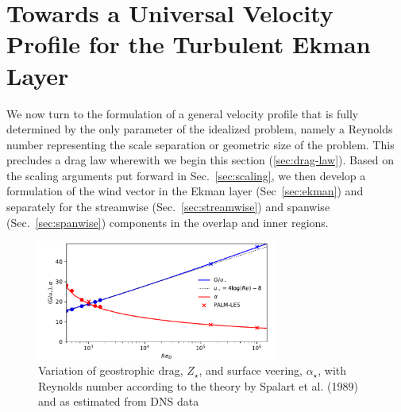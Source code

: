 \documentclass[a4paper,11pt]{amsart}
\begin{document}
\section{Towards a Universal Velocity Profile for the Turbulent Ekman Layer}
\label{sec:profiles} 
%
We now turn to the formulation of a general velocity profile that is fully determined by the only
parameter of the idealized problem, namely a Reynolds number representing the scale separation or
geometric size of the problem.
%
This precludes a drag law wherewith we begin this section (\ref{sec:drag-law}).
Based on the scaling arguments put forward in Sec.~\ref{sec:scaling}, we then develop
a formulation of the wind vector in the Ekman layer (Sec~\ref{sec:ekman}) and separately
for the streamwise (Sec.~\ref{sec:streamwise}) and spanwise (Sec.~\ref{sec:spanwise}) components
in the overlap and inner regions. 
%
\begin{figure}
  \centerline{\includegraphics[width=0.7\textwidth]{../plot/ustar_alpha.pdf}}
  \caption{Variation of geostrophic drag, $Z_\star$, and surface veering, $\alpha_\star$, with Reynolds number according to
    the theory by Spalart et al. (1989) and as estimated from DNS data
    \label{fig:drag_law}}
\end{figure}
% 
\end{document}
